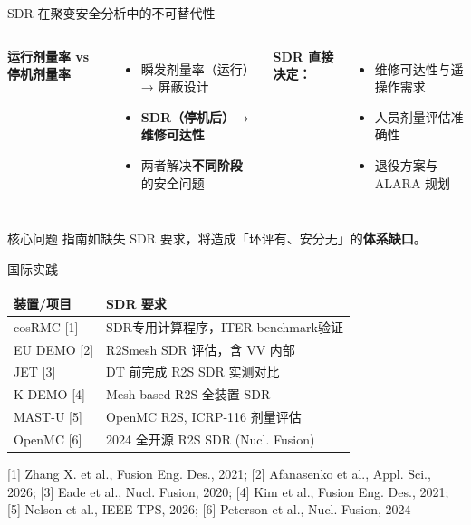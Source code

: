 \documentclass[aspectratio=169]{ctexbeamer}
\begin{document}
\begin{frame}{SDR 在聚变安全分析中的不可替代性}
	\begin{columns}[T]
		\textbf{运行剂量率 vs 停机剂量率}
		\begin{itemize}
			\item 瞬发剂量率（运行）→ 屏蔽设计
			\item \textbf{SDR（停机后）→ 维修可达性}
			\item 两者解决\textbf{不同阶段}的安全问题
		\end{itemize}

		\textbf{SDR 直接决定：}
		\begin{itemize}
			\item 维修可达性与遥操作需求
			\item 人员剂量评估准确性
			\item 退役方案与 ALARA 规划
		\end{itemize}
	\end{columns}

	\vspace{8pt}
	\begin{alertblock}{核心问题}
		指南如缺失 SDR 要求，将造成「环评有、安分无」的\textbf{体系缺口}。
	\end{alertblock}
\end{frame}

\begin{frame}{国际实践}
	\begin{table}
		\small
		\begin{tabular}{p{2.8cm} p{6.5cm}}
			\toprule
			\textbf{装置/项目} & \textbf{SDR 要求}                 \\
			\midrule
			cosRMC [1]     & SDR专用计算程序，ITER benchmark验证      \\
			EU DEMO [2]    & R2Smesh SDR 评估，含 VV 内部          \\
			JET [3]        & DT 前完成 R2S SDR 实测对比             \\
			K-DEMO [4]     & Mesh-based R2S 全装置 SDR          \\
			MAST-U [5]     & OpenMC R2S, ICRP-116 剂量评估       \\
			OpenMC [6]     & 2024 全开源 R2S SDR (Nucl. Fusion) \\
			\bottomrule
		\end{tabular}
	\end{table}

	\vspace{6pt}
	{\footnotesize [1] Zhang X. et al., Fusion Eng. Des., 2021; [2] Afanasenko et al., Appl. Sci., 2026; [3] Eade et al., Nucl. Fusion, 2020; [4] Kim et al., Fusion Eng. Des., 2021; [5] Nelson et al., IEEE TPS, 2026; [6] Peterson et al., Nucl. Fusion, 2024}
\end{frame}
\end{document}
